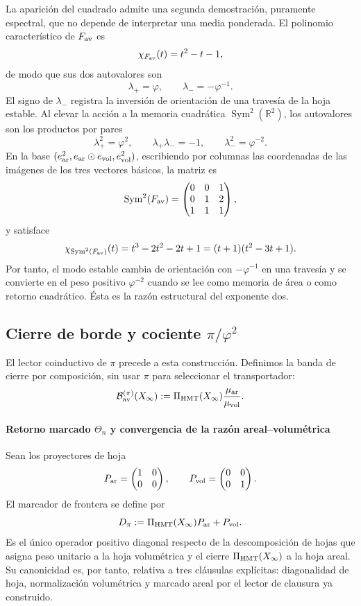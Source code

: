 La aparición del cuadrado admite una segunda demostración, puramente
espectral, que no depende de interpretar una media ponderada. El polinomio
característico de \(F_{\rm av}\) es
\[
 \chi_{F_{\rm av}}(t)=t^2-t-1,
\]
de modo que sus dos autovalores son
\[
 \lambda_+=\varphi,\qquad \lambda_-=-\varphi^{-1}.
\]
El signo de \(\lambda_-\) registra la inversión de orientación de una
travesía de la hoja estable. Al elevar la acción a la memoria cuadrática
\(\operatorname{Sym}^2(\mathbb R^2)\), los autovalores son los productos
por pares
\[
 \lambda_+^2=\varphi^2,\qquad
 \lambda_+\lambda_-=-1,\qquad
 \lambda_-^2=\varphi^{-2}.
\]
En la base
\((e_{\rm ar}^2,e_{\rm ar}\odot e_{\rm vol},e_{\rm vol}^2)\), escribiendo
por columnas las coordenadas de las imágenes de los tres vectores básicos, la
matriz es
\[
 \operatorname{Sym}^2(F_{\rm av})=
 \begin{pmatrix}
 0&0&1\\
 0&1&2\\
 1&1&1
 \end{pmatrix},
\]
y satisface
\[
 \chi_{\operatorname{Sym}^2(F_{\rm av})}(t)
 =t^3-2t^2-2t+1
 =(t+1)(t^2-3t+1).
\]
Por tanto, el modo estable cambia de orientación con
\(-\varphi^{-1}\) en una travesía y se convierte en el peso positivo
\(\varphi^{-2}\) cuando se lee como memoria de área o como retorno
cuadrático. Ésta es la razón estructural del exponente dos.

\subsection{Cierre de borde y cociente \texorpdfstring{$\pi/\varphi^2$}{pi/phi2}}

El lector coinductivo de \(\pi\) precede a esta construcción. Definimos la
banda de cierre por composición, sin usar \(\pi\) para seleccionar el
transportador:
\[
 \mathcal B_{\rm av}^{(\pi)}(X_\infty)
 :=\Pi_{\rm HMT}(X_\infty)
 \frac{\mu_{\rm ar}}{\mu_{\rm vol}}.
\]

\paragraph{Retorno marcado \(\Theta_n\) y convergencia de la razón areal–volumétrica}
Sean los proyectores de hoja
\[
 P_{\rm ar}=\begin{pmatrix}1&0\\0&0\end{pmatrix},
 \qquad
 P_{\rm vol}=\begin{pmatrix}0&0\\0&1\end{pmatrix}.
\]
El marcador de frontera se define por
\[
 D_\pi:=\Pi_{\rm HMT}(X_\infty)P_{\rm ar}+P_{\rm vol}.
\]
Es el único operador positivo diagonal respecto de la descomposición de
hojas que asigna peso unitario a la hoja volumétrica y el cierre
\(\Pi_{\rm HMT}(X_\infty)\) a la hoja areal. Su canonicidad es, por tanto,
relativa a tres cláusulas explícitas: diagonalidad de hoja, normalización
volumétrica y marcado areal por el lector de clausura ya construido.

